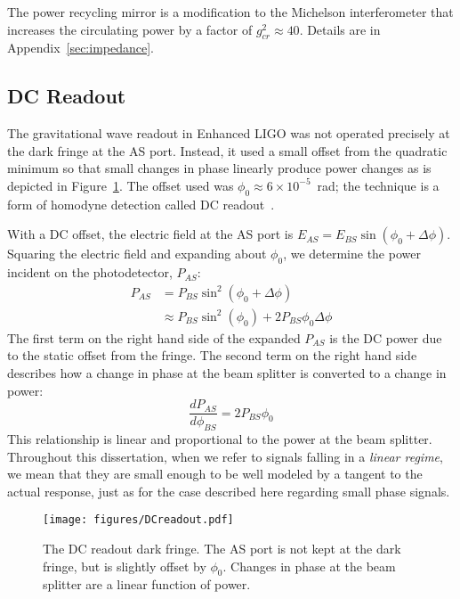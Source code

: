 The power recycling mirror is a modification to the Michelson
interferometer that increases the circulating power by a factor of
$g_{cr}^2 \approx 40$. Details are in Appendix~\ref{sec:impedance}.


\subsection{DC Readout}
\label{sec:DCreadout}
The gravitational wave readout in Enhanced LIGO was not operated
precisely at the dark fringe at the AS port. Instead, it used a small
offset from the quadratic minimum so that small changes in phase
linearly produce power changes as is depicted in
Figure~\ref{fig:DCreadout}. The offset used was $\phi_0 \approx 6
\times 10^{-5}$~rad; the technique is a form of homodyne detection
called DC readout~\cite{TobinThesis}.

With a DC offset, the electric field at the AS port is $E_{AS} =
E_{BS}\sin{(\phi_0 + \Delta\phi)}$. Squaring the electric field and
expanding about $\phi_0$, we determine the power incident on the
photodetector, $P_{AS}$:
\begin{align}
P_{AS} &= P_{BS} \sin^2{(\phi_0 + \Delta\phi)} \\
 &\approx P_{BS}\sin^2{(\phi_0)} + 2P_{BS}\phi_0\Delta\phi
\end{align}
The first term on the right hand side of the expanded $P_{AS}$ is the
DC power due to the static offset from the fringe. The second term on
the right hand side describes how a change in phase at the beam
splitter is converted to a change in power:
\begin{equation}
\frac{d P_{AS}}{d \phi_{BS}} =2 P_{BS} \phi_0 
\label{eq:dP_dphi}
\end{equation}
This relationship is linear and proportional to the power at the beam
splitter. Throughout this dissertation, when we refer to signals
falling in a \emph{linear regime}, we mean that they are small enough
to be well modeled by a tangent to the actual response, just as for
the case described here regarding small phase signals.

\begin{figure}
\begin{centering}
\texttt{[image: figures/DCreadout.pdf]}
\caption[The DC readout dark fringe]{The DC readout dark fringe. The
  AS port is not kept at the dark fringe, but is slightly offset by
  $\phi_0$. Changes in phase at the beam splitter are a linear
  function of power.}
\label{fig:DCreadout}
\end{centering}
\end{figure}



